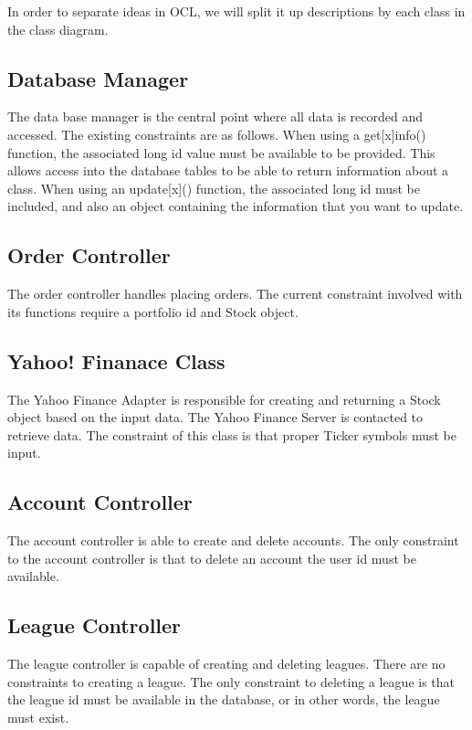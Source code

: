 In order to separate ideas in OCL, we will split it up descriptions by each
class in the class diagram.

\subsection{Database Manager}
The data base manager is the central point where all data is recorded and
accessed. The existing constraints are as follows. When using a get[x]info()
function, the associated long id value must be available to be provided.
This allows access into the database tables to be able to return information
about a class. When using an update[x]() function, the associated long id must
be included, and also an object containing the information that you want to
update.

\subsection{Order Controller}
The order controller handles placing orders. The current constraint involved
with its functions require a portfolio id and Stock object.

\subsection{Yahoo! Finanace Class}

The Yahoo Finance Adapter is responsible for creating and returning a Stock
object based on the input data. The Yahoo Finance Server is contacted to
retrieve data. The constraint of this class is that proper Ticker symbols must
be input.

\subsection{Account Controller}
The account controller is able to create and delete accounts. The only
constraint to the account controller is that to delete an account the user id
must be available.

\subsection{League Controller}
The league controller is capable of creating and deleting leagues. There are no
constraints to creating a league. The only constraint to deleting a league is
that the league id must be available in the database, or in other words, the
league must exist.


